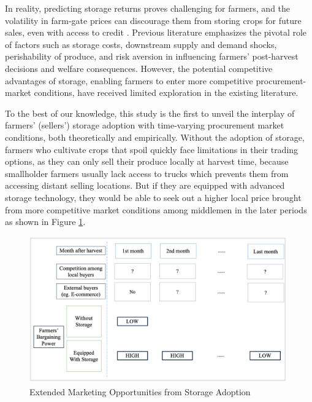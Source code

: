 \documentclass[12pt,authoryear, notitlepage]{elegantpaper}
\begin{document}
In reality, predicting storage returns proves challenging for farmers, and the volatility in farm-gate prices can discourage them from storing crops for future sales, even with access to credit \citep{cardell2023price}. Previous literature emphasizes the pivotal role of factors such as storage costs, downstream supply and demand shocks, perishability of produce, and risk aversion in influencing farmers' post-harvest decisions and welfare consequences. However, the potential competitive advantages of storage, enabling farmers to enter more competitive procurement-market conditions, have received limited exploration in the existing literature.

To the best of our knowledge, this study is the first to unveil the interplay of farmers' (sellers') storage adoption with time-varying procurement market conditions, both theoretically and empirically. Without the adoption of storage, farmers who cultivate crops that spoil quickly face limitations in their trading options, as they can only sell their produce locally at harvest time, because smallholder farmers usually lack access to trucks which prevents them from accessing distant selling locations. But if they are equipped with advanced storage technology, they would be able to seek out a higher local price brought from more competitive market conditions among middlemen in the later periods as shown in Figure \ref{Figure: Demo}.

\begin{figure}[ht]
\centering
\includegraphics[width=1\textwidth]{figures/graphic_demo.png}
\caption{Extended Marketing Opportunities from Storage Adoption}
\label{Figure: Demo}
\end{figure}
\end{document}
